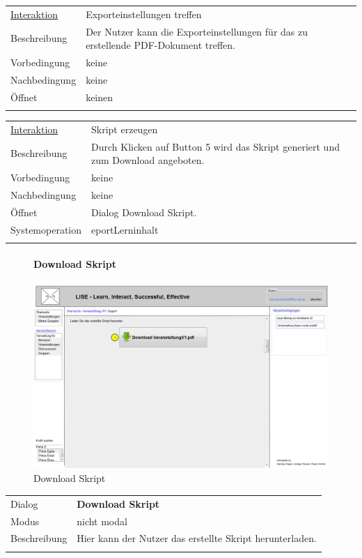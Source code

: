 \documentclass[12pt,a4paper]{article}
\begin{document}
{\begin{tabular}{l p{12cm}}
	\underline{Interaktion} 	 & Exporteinstellungen treffen\\ 
	Beschreibung   	& Der Nutzer kann die Exporteinstellungen für das zu erstellende PDF-Dokument treffen.\\
	Vorbedingung	& keine \\
	Nachbedingung	& keine \\
	Öffnet			& keinen\\\\
\end{tabular}

\begin{tabular}{l p{12cm}}
	\underline{Interaktion} 	 & Skript erzeugen\\ 
	Beschreibung   	& Durch Klicken auf Button 5 wird das Skript generiert und zum Download angeboten.\\
	Vorbedingung	& keine \\
	Nachbedingung	& keine \\
	Öffnet			& Dialog \glqq Download Skript\grqq.\\
	Systemoperation & eportLerninhalt\\\\
\end{tabular}

\begin{figure}[H]
	\centering
	\paragraph{Download Skript}
	\includegraphics[width=\textwidth]{Bilder/Mockups/GUI/DonwloadSkript.png}
	\caption{Download Skript}
	\label{GuiDownloadSkript}
\end{figure}
\begin{tabular}{l p{12cm}}
	Dialog 	 & \textbf{Download Skript} \\ 
	Modus & nicht modal\\ 
	Beschreibung   	& Hier kann der Nutzer das erstellte Skript herunterladen. \\\\
	

\end{tabular}}
\end{document}

